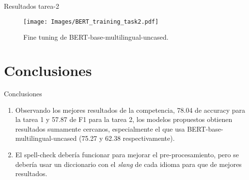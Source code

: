 \documentclass[10pt]{beamer}
\begin{document}
\begin{frame}{Resultados tarea-2}
\justify	
\small
\begin{table}[H]
\centering
{}
\caption{Resultados para los distintos modelos para la segunda tarea.}
\end{table}

\begin{figure}[H]
\centering
\texttt{[image: Images/BERT\_training\_task2.pdf]}
\caption{Fine tuning de BERT-base-multilingual-uncased.}
\end{figure}

\end{frame}

\section{Conclusiones}
\begin{frame}{Conclusiones}
\justify	
\small

\begin{enumerate}
\item Observando los mejores resultados de la competencia, 78.04 de accuracy para la tarea 1 y 57.87 de F1 para la tarea 2, los modelos propuestos obtienen resultados sumamente cercanos, especialmente el que usa BERT-base-multilingual-uncased (75.27 y 62.38 respectivamente).


\item El spell-check debería funcionar para mejorar el pre-procesamiento, pero se debería usar un diccionario con el \emph{slang} de cada idioma para que de mejores resultados.
\end{enumerate}

\end{frame}
\end{document}
